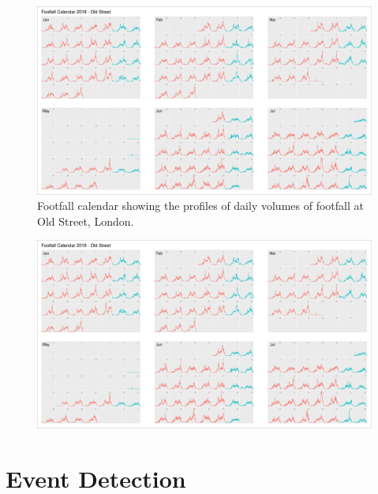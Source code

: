 \cleartoleftpage
{}
\begin{figure}
  \forceversofloat
  \includegraphics[width=172mm,trim={0 0 1310 -42},clip]{images/applications-footfall-calendar.png}
  \caption{Footfall calendar showing the profiles of daily volumes of footfall at Old Street, London.}
  \label{figure:applications:footfall:calendar}
\end{figure}
\clearpage
\begin{figure}
  \forcerectofloat
  \includegraphics[width=172mm,trim={1315 0 0 0},clip]{images/applications-footfall-calendar.png}
  \caption[]{}
  \label{}
\end{figure}
\restoregeometry
\clearpage

\section{Event Detection}

